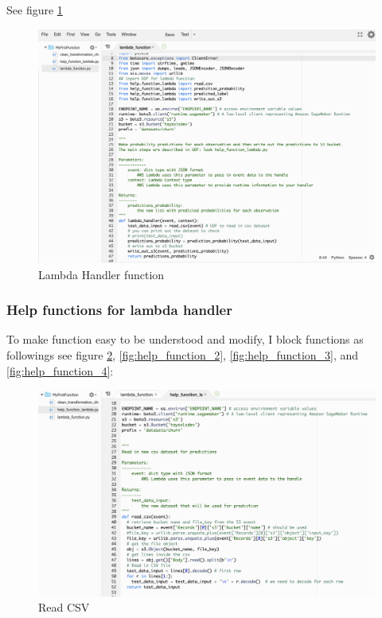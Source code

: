 \documentclass[12pt]{article}
\begin{document}
See figure \ref{fig:lambda_handler}

\begin{figure}[H]
\centering
\begin{minipage}{1\textwidth}
  \centering
  \includegraphics[width=1\linewidth]{lambda_handler.png}
   \caption{Lambda Handler function}
   \label{fig:lambda_handler}
\end{minipage}%
\end{figure}


\subsubsection{Help functions for lambda handler}
To make function easy to be understood and modify, I block functions as followings see figure \ref{fig:help_function_1}, \ref{fig:help_function_2}, \ref{fig:help_function_3}, and \ref{fig:help_function_4}:


\begin{figure}[H]
\centering
\begin{minipage}{1\textwidth}
  \centering
  \includegraphics[width=1\linewidth]{help_function_1.png}
   \caption{Read CSV}
   \label{fig:help_function_1}
\end{minipage}%
\end{figure}
\end{document}
